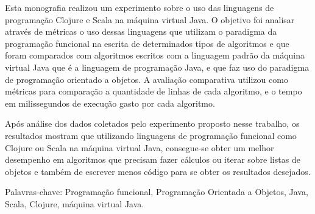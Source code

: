 \begin{resumo}
\vspace{-1cm}

\onehalfspacing

\noindent
  Esta monografia realizou um experimento sobre o uso das linguagens de programação Clojure e Scala na máquina virtual Java. O objetivo foi analisar através de métricas o uso dessas linguagens que utilizam o paradigma da programação funcional na escrita de determinados tipos de algoritmos e que foram comparados com algoritmos escritos com a linguagem padrão da máquina virtual Java que é a linguagem de programação Java, e que faz uso do paradigma de programação orientado a objetos. A avaliação comparativa utilizou como métricas para comparação a quantidade de linhas de cada algoritmo, e o tempo em milissegundos de execução gasto por cada algoritmo.

  Após análise dos dados coletados pelo experimento proposto nesse trabalho, os resultados mostram que utilizando linguagens de programação funcional como Clojure ou Scala na máquina virtual Java, consegue-se obter um melhor desempenho em algoritmos que precisam fazer cálculos ou iterar sobre listas de objetos e também de escrever menos código para se obter os resultados desejados.

\vspace*{.75cm}

\noindent Palavras-chave: Programação funcional, Programação Orientada a Objetos, Java, Scala, Clojure, máquina virtual Java.\\

\end{resumo}
